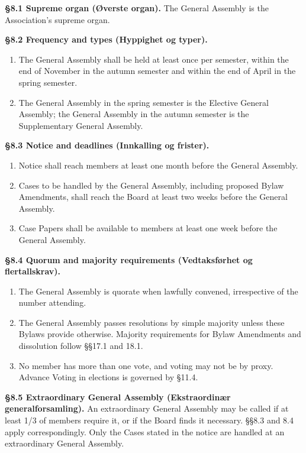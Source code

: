 \documentclass{../../../Common/Latex/Templates/rapport}
\begin{document}
\textbf{\S 8.1 Supreme organ (Øverste organ).} The General Assembly is the Association's supreme organ.

\textbf{\S 8.2 Frequency and types (Hyppighet og typer).}
\begin{enumerate}
  \item The General Assembly shall be held at least once per semester, within the end of November in the autumn semester and within the end of April in the spring semester.
  \item The General Assembly in the spring semester is the Elective General Assembly; the General Assembly in the autumn semester is the Supplementary General Assembly.
\end{enumerate}

\textbf{\S 8.3 Notice and deadlines (Innkalling og frister).}
\begin{enumerate}
  \item Notice shall reach members at least one month before the General Assembly.
  \item Cases to be handled by the General Assembly, including proposed Bylaw Amendments, shall reach the Board at least two weeks before the General Assembly.
  \item Case Papers shall be available to members at least one week before the General Assembly.
\end{enumerate}

\textbf{\S 8.4 Quorum and majority requirements (Vedtaksførhet og flertallskrav).}
\begin{enumerate}
  \item The General Assembly is quorate when lawfully convened, irrespective of the number attending.
  \item The General Assembly passes resolutions by simple majority unless these Bylaws provide otherwise. Majority requirements for Bylaw Amendments and dissolution follow \S\S17.1 and 18.1.
  \item No member has more than one vote, and voting may not be by proxy. Advance Voting in elections is governed by \S11.4.
\end{enumerate}

\textbf{\S 8.5 Extraordinary General Assembly (Ekstraordinær generalforsamling).} An extraordinary General Assembly may be called if at least 1/3 of members require it, or if the Board finds it necessary. \S\S8.3 and 8.4 apply correspondingly. Only the Cases stated in the notice are handled at an extraordinary General Assembly.
\end{document}
